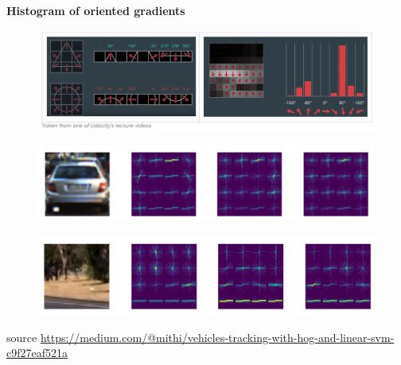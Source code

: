 \documentclass[xcolor=dvipsnames]{beamer}
\begin{document}
\begin{frame}{\bf Histogram of oriented gradients}

\begin{figure}[!htb]
  \centering
  \includegraphics[scale=0.2]{../../pictures/image_processing/hog.png}
\end{figure}

\begin{figure}[!htb]
  \centering
  \includegraphics[scale=0.1]{../../pictures/image_processing/hog_car.png}
\end{figure}

\begin{figure}[!htb]
  \centering
  \includegraphics[scale=0.1]{../../pictures/image_processing/hog_no_car.png}
\end{figure}

{\tiny source \url{https://medium.com/@mithi/vehicles-tracking-with-hog-and-linear-svm-c9f27eaf521a}}

\end{frame}
\end{document}
